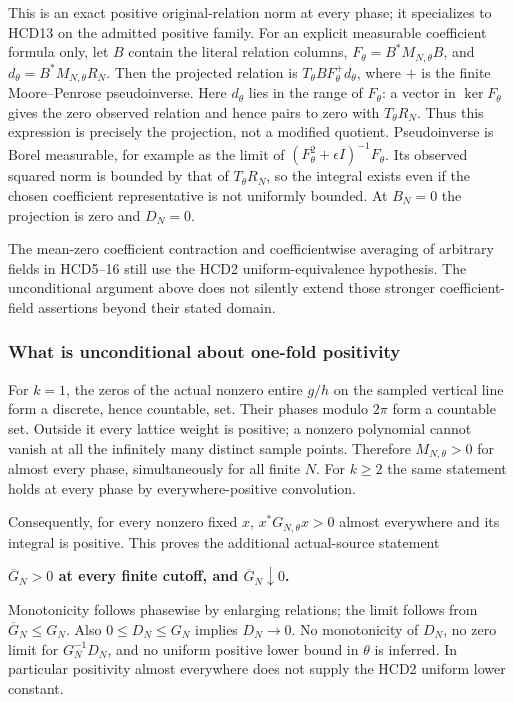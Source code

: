 This is an exact positive original-relation norm at every phase; it specializes to HCD13 on the admitted positive family. For an explicit measurable coefficient formula only, let \(B\) contain the literal relation columns, \(F_\theta=B^*M_{N,\theta}B\), and \(d_\theta=B^*M_{N,\theta}R_N\). Then the projected relation is \(T_\theta BF_\theta^+d_\theta\), where \(+\) is the finite Moore--Penrose pseudoinverse. Here \(d_\theta\) lies in the range of \(F_\theta\): a vector in \(\ker F_\theta\) gives the zero observed relation and hence pairs to zero with \(T_\theta R_N\). Thus this expression is precisely the projection, not a modified quotient. Pseudoinverse is Borel measurable, for example as the limit of \((F_\theta^2+\epsilon I)^{-1}F_\theta\). Its observed squared norm is bounded by that of \(T_\theta R_N\), so the integral exists even if the chosen coefficient representative is not uniformly bounded. At \(B_N=0\) the projection is zero and \(D_N=0\).

The mean-zero coefficient contraction and coefficientwise averaging of arbitrary fields in HCD5--16 still use the HCD2 uniform-equivalence hypothesis. The unconditional argument above does not silently extend those stronger coefficient-field assertions beyond their stated domain.

\subsubsection{What is unconditional about one-fold positivity}\label{what-is-unconditional-about-one-fold-positivity}

For \(k=1\), the zeros of the actual nonzero entire \(g/h\) on the sampled vertical line form a discrete, hence countable, set. Their phases modulo \(2\pi\) form a countable set. Outside it every lattice weight is positive; a nonzero polynomial cannot vanish at all the infinitely many distinct sample points. Therefore \(M_{N,\theta}>0\) for almost every phase, simultaneously for all finite \(N\). For \(k\ge2\) the same statement holds at every phase by everywhere-positive convolution.

Consequently, for every nonzero fixed \(x\), \(x^*G_{N,\theta}x>0\) almost everywhere and its integral is positive. This proves the additional actual-source statement

\textbf{\(\overline G_N>0\) at every finite cutoff, and \(\overline G_N\downarrow0\).}

Monotonicity follows phasewise by enlarging relations; the limit follows from \(\overline G_N\le G_N\). Also \(0\le D_N\le G_N\) implies \(D_N\longrightarrow0\). No monotonicity of \(D_N\), no zero limit for \(G_N^{-1}D_N\), and no uniform positive lower bound in \(\theta\) is inferred. In particular positivity almost everywhere does not supply the HCD2 uniform lower constant.

